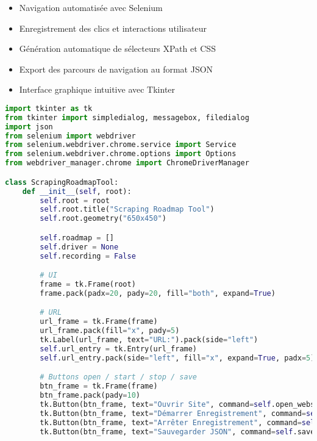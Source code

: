 \documentclass[10pt,a4paper,twocolumn]{article}
\begin{document}
\begin{itemize}
    \item Navigation automatisée avec Selenium
    \item Enregistrement des clics et interactions utilisateur
    \item Génération automatique de sélecteurs XPath et CSS
    \item Export des parcours de navigation au format JSON
    \item Interface graphique intuitive avec Tkinter
\end{itemize}
\begin{lstlisting}[language=Python,
  caption=Extrait du code de l'outil de scraping,
  basicstyle=\scriptsize,
  breaklines=true,
  postbreak=\mbox{\textcolor{red}{$\hookrightarrow$}\space},
  columns=flexible,
  frame=single,              % active le cadre
  xleftmargin=4em,           % décale le texte à l'intérieur du cadre
  framexleftmargin=2em       % décale le cadre pour qu'il suive le texte
]
import tkinter as tk
from tkinter import simpledialog, messagebox, filedialog
import json
from selenium import webdriver
from selenium.webdriver.chrome.service import Service
from selenium.webdriver.chrome.options import Options
from webdriver_manager.chrome import ChromeDriverManager

class ScrapingRoadmapTool:
    def __init__(self, root):
        self.root = root
        self.root.title("Scraping Roadmap Tool")
        self.root.geometry("650x450")

        self.roadmap = []
        self.driver = None
        self.recording = False

        # UI
        frame = tk.Frame(root)
        frame.pack(padx=20, pady=20, fill="both", expand=True)

        # URL
        url_frame = tk.Frame(frame)
        url_frame.pack(fill="x", pady=5)
        tk.Label(url_frame, text="URL:").pack(side="left")
        self.url_entry = tk.Entry(url_frame)
        self.url_entry.pack(side="left", fill="x", expand=True, padx=5)

        # Buttons open / start / stop / save
        btn_frame = tk.Frame(frame)
        btn_frame.pack(pady=10)
        tk.Button(btn_frame, text="Ouvrir Site", command=self.open_website).pack(side="left", padx=5)
        tk.Button(btn_frame, text="Démarrer Enregistrement", command=self.start_recording).pack(side="left", padx=5)
        tk.Button(btn_frame, text="Arrêter Enregistrement", command=self.stop_recording).pack(side="left", padx=5)
        tk.Button(btn_frame, text="Sauvegarder JSON", command=self.save_roadmap).pack(side="left", padx=5)


\end{lstlisting}
\end{document}
